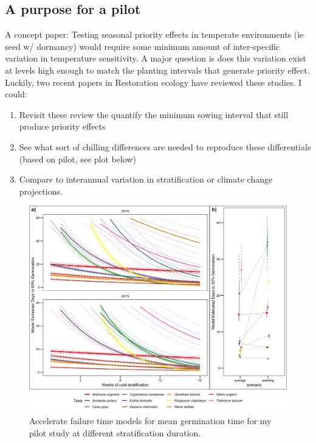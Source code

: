 \documentclass{article}\usepackage[]{graphicx}\usepackage[]{color}
\begin{document}
\subsection{A purpose for a pilot}
A concept paper: Testing seasonal priority effects in temperate environments (ie seed w/ dormancy) would require some minimum amount of inter-specific variation in temperature sensitivity. A major question is does this variation exist at levels high enough to match the planting intervals that generate priority effect. Luckily, two recent papers in Restoration ecology have reviewed these studies. I could:\\
\begin{enumerate}
\item Revisit these review the quantify the minimum sowing interval that still produce priority effects
\item See what sort of chilling differences are needed to reproduce these differentials (based on pilot, see plot below)
\item Compare to interannual variation in stratification or climate change projections.
\end{enumerate}

\begin{figure}[h!]
        \centering
         \includegraphics[width=\textwidth]{../figure/AFTplots.jpeg}
                 \caption{Accelerate failure time models for mean germination time for my pilot study at different stratification duration.}
    \end{figure} 
\end{document}
